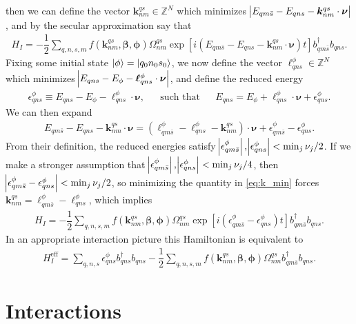 \documentclass[aps,notitlepage,nofootinbib,10pt]{revtex4-1}
\renewcommand{\t}{\text} %
\newcommand{\f}[2]{\dfrac{#1}{#2}} %
\newcommand{\p}[1]{\left(#1\right)} %
\renewcommand{\sp}[1]{\left[#1\right]} %
\renewcommand{\v}{\bm} %
\renewcommand{\c}{\cdot} %
\newcommand{\1}{\mathds{1}}
\newcommand{\Z}{\mathbb{Z}}
\begin{document}
then we can define the vector $\v k^{qs}_{nm}\in\Z^N$ which
minimizes $\abs{E_{qm\bar s}-E_{qns}-\v k^{qs}_{nm}\c\v\nu}$, and
by the secular approximation say that
\begin{align}
  H_I = -\f12\sum_{q,n,s,m} f\p{\v k^{qs}_{nm},\v\beta,\v\phi}
  \Omega^{qs}_{nm}
  \exp\sp{i\p{E_{qm\bar s}-E_{qns}-\v k^{qs}_{nm}\c\v\nu}t}
  b_{qm\bar s}^\dag b_{qns}.
\end{align}
Fixing some initial state $\ket\phi=\ket{q_0n_0s_0}$, we now define
the vector $\v\ell^\phi_{qns}\in\Z^N$ which minimizes
$\abs{E_{qns}-E_\phi-\v\ell^\phi_{qns}\c\v\nu}$, and define the reduced
energy
\begin{align}
  \epsilon_{qns}^\phi \equiv E_{qns} - E_\phi - \v\ell^\phi_{qns}\c\v\nu,
  &&
  \t{such that}
  &&
  E_{qns} = E_\phi + \v\ell^\phi_{qns}\c\v\nu + \epsilon_{qns}^\phi.
\end{align}
We can then expand
\begin{align}
  E_{qm\bar s} - E_{qns} - \v k^{qs}_{nm}\c\v\nu
  = \p{\v\ell^\phi_{qm\bar s} - \v\ell^\phi_{qns}
    - \v k^{qs}_{nm}}\c\v\nu
  + \epsilon_{qm\bar s}^\phi - \epsilon_{qns}^\phi.
  \label{eq:k_min}
\end{align}
From their definition, the reduced energies satisfy
$\abs{\epsilon_{qm\bar s}^\phi}, \abs{\epsilon_{qns}^\phi} <
\min_j\nu_j/2$.  If we make a stronger assumption that
$\abs{\epsilon_{qm\bar s}^\phi}, \abs{\epsilon_{qns}^\phi} <
\min_j\nu_j/4$, then
$\abs{\epsilon_{qm\bar s}^\phi - \epsilon_{qns}^\phi} <
\min_j\nu_j/2$, so minimizing the quantity in \eqref{eq:k_min} forces
$\v k^{qs}_{nm} = \v\ell^\phi_{qm\bar s} - \v\ell^\phi_{qns}$,
which implies
\begin{align}
  H_I = -\f12\sum_{q,n,s,m} f\p{\v k^{qs}_{nm},\v\beta,\v\phi}
  \Omega^{qs}_{nm}
  \exp\sp{i\p{\epsilon_{qm\bar s}^\phi-\epsilon_{qns}^\phi}t}
  b_{qm\bar s}^\dag b_{qns}.
\end{align}
In an appropriate interaction picture this Hamiltonian is equivalent to
\begin{align}
  H_I^{\t{eff}} =
  \sum_{q,n,s} \epsilon_{qns}^\phi b_{qns}^\dag b_{qns}
  - \f12\sum_{q,n,s,m} f\p{\v k^{qs}_{nm},\v\beta,\v\phi}
  \Omega^{qs}_{nm} b_{qm\bar s}^\dag b_{qns}.
\end{align}



\section{Interactions}
\end{document}
